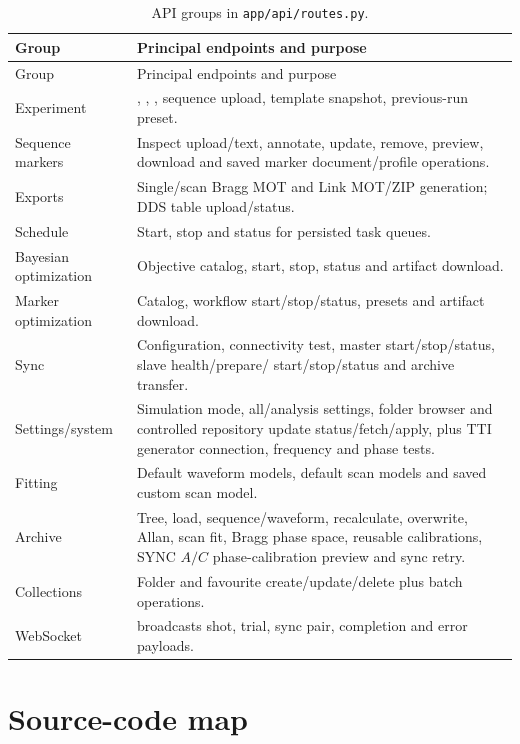 \documentclass[11pt,oneside,openany]{book}
\newcommand{\code}[1]{\texttt{\detokenize{#1}}}
\newcommand{\pathcode}[1]{\nolinkurl{#1}}
\begin{document}
\small
\begin{longtable}{p{} p{}}
\caption{API groups in \pathcode{app/api/routes.py}.}\\
\toprule Group & Principal endpoints and purpose\\ \midrule
\endfirsthead
\toprule Group & Principal endpoints and purpose\\ \midrule
\endhead
Experiment & \code{/experiment/start}, \code{/experiment/stop},
\code{/experiment/status}, sequence upload, template snapshot, previous-run preset.\\
Sequence markers & Inspect upload/text, annotate, update, remove, preview, download and
saved marker document/profile operations.\\
Exports & Single/scan Bragg MOT and Link MOT/ZIP generation; DDS table upload/status.\\
Schedule & Start, stop and status for persisted task queues.\\
Bayesian optimization & Objective catalog, start, stop, status and artifact download.\\
Marker optimization & Catalog, workflow start/stop/status, presets and artifact download.\\
Sync & Configuration, connectivity test, master start/stop/status, slave health/prepare/
start/stop/status and archive transfer.\\
Settings/system & Simulation mode, all/analysis settings, folder browser and controlled
repository update status/fetch/apply, plus TTI generator connection, frequency and phase
tests.\\
Fitting & Default waveform models, default scan models and saved custom scan model.\\
Archive & Tree, load, sequence/waveform, recalculate, overwrite, Allan, scan fit, Bragg
phase space, reusable calibrations, SYNC $A/C$ phase-calibration preview and sync retry.\\
Collections & Folder and favourite create/update/delete plus batch operations.\\
WebSocket & \code{/ws} broadcasts shot, trial, sync pair, completion and error payloads.\\
\bottomrule
\end{longtable}
\normalsize

\chapter{Source-code map}
\end{document}
